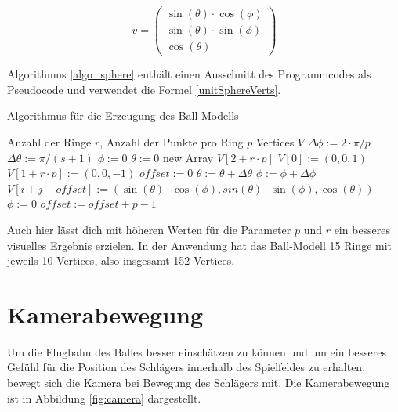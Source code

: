 \begin{equation}
\label{unitSphereVerts}
v=\begin{pmatrix}
	\sin (\theta) \cdot \cos (\phi)\\
	\sin (\theta) \cdot \sin (\phi)\\
	\cos (\theta)
  \end{pmatrix}
\end{equation}

Algorithmus \ref{algo_sphere} enthält einen Ausschnitt des Programmcodes als Pseudocode und verwendet die Formel \ref{unitSphereVerts}.

\begin{algorithm}[t]
	\centering
	\caption{Algorithmus für die Erzeugung des Ball-Modells} \label{algo_sphere}
	\begin{algorithmic}
		\REQUIRE Anzahl der Ringe $r$, Anzahl der Punkte pro Ring $p$
		\ENSURE Vertices $V$
		\STATE $\Delta\phi := 2\cdot\pi/p$
		\STATE $\Delta\theta := \pi/(s + 1)$
		\STATE $\phi := 0$
		\STATE $\theta := 0$
		\STATE new Array $V[2 + r \cdot p]$
		\STATE $V[0] := (0,0,1)$
		\STATE $V[1 + r \cdot p] := (0,0,-1)$
		\STATE $offset := 0$
		\STATE $\theta := \theta +\Delta\theta$
			\STATE $\phi := \phi +\Delta\phi$
			\STATE $V[i + j + offset] := (\sin(\theta)\cdot\cos(\phi), sin(\theta) \cdot \sin(\phi), \cos(\theta))$
			\ENDFOR
			\STATE $\phi := 0$
			\STATE $offset := offset + p - 1$
		\ENDFOR
	\end{algorithmic}
\end{algorithm}

Auch hier lässt dich mit höheren Werten für die Parameter $p$ und $r$ ein besseres visuelles Ergebnis erzielen. In der Anwendung hat das Ball-Modell 15 Ringe mit jeweils 10 Vertices, also insgesamt 152 Vertices.

\section{Kamerabewegung}
%
Um die Flugbahn des Balles besser einschätzen zu können und um ein besseres Gefühl für die
Position des Schlägers innerhalb des Spielfeldes zu erhalten, bewegt sich die Kamera bei Bewegung des Schlägers mit. Die Kamerabewegung ist in Abbildung \ref{fig:camera} dargestellt.


